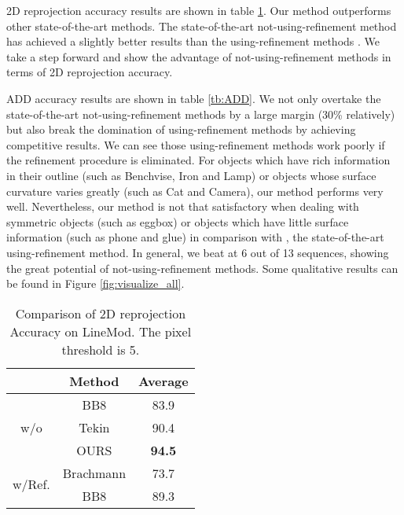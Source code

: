 \documentclass[10pt,twocolumn,letterpaper]{article}
\begin{document}
2D reprojection accuracy results are shown in table \ref{tb:reprojection_accuracy}. Our method outperforms other state-of-the-art methods. The state-of-the-art not-using-refinement method \cite{tekin18} has achieved a slightly better results than the using-refinement methods \cite{7780735, Rad2017BB8AS}. We take a step forward and show the advantage of not-using-refinement methods in terms of 2D reprojection accuracy.

ADD accuracy results are shown in table \ref{tb:ADD}. We not only overtake the state-of-the-art not-using-refinement methods by a large margin (30\% relatively) but also break the domination of using-refinement methods by achieving competitive results. We can see those using-refinement methods work poorly if the refinement procedure is eliminated. For objects which have rich information in their outline (such as Benchvise, Iron and Lamp) or objects whose surface curvature varies greatly (such as Cat and Camera), our method performs very well. Nevertheless, our method is not that satisfactory when dealing with symmetric objects (such as eggbox) or objects which have little surface information (such as phone and glue) in comparison with \cite{Kehl2017SSD6DMR}, the state-of-the-art using-refinement method. In general, we beat \cite{Kehl2017SSD6DMR} at 6 out of 13 sequences, showing the great potential of not-using-refinement methods. Some qualitative results can be found in Figure \ref{fig:visualize_all}.

\begin{table}[t]
\begin{center}
\begin{tabular}{|c|c|c|}
\hline
                        & Method    & Average       \\ \hline
\multirow{3}{*}{w/o}    & BB8 \cite{Rad2017BB8AS}       & 83.9          \\ \cline{2-3}
                        & Tekin \cite{tekin18} & 90.4          \\ \cline{2-3}
                        & OURS      & \textbf{94.5} \\ \hline
\multirow{2}{*}{w/Ref.} & Brachmann \cite{7780735} & 73.7          \\ \cline{2-3}
                        & BB8 \cite{Rad2017BB8AS}       & 89.3          \\ \hline

\end{tabular}
\end{center}
\caption{Comparison of 2D reprojection Accuracy on LineMod. The pixel threshold is 5.}
\label{tb:reprojection_accuracy}
\end{table}
\end{document}
